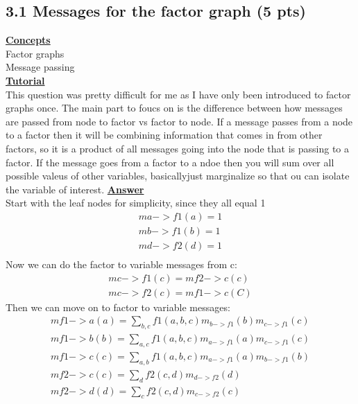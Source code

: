 \documentclass[11pt]{article}
\begin{document}
\subsection{3.1 Messages for the factor graph (5 pts)}
\noindent \textbf{\underline{Concepts}}\\
Factor graphs\\
Message passing\\
\noindent \textbf{\underline{Tutorial}}\\
This question was pretty difficult for me as I have only been introduced to factor graphs once.  The main part to foucs on is the difference
 between how messages are passed from node to factor vs factor to node.  If a message passes from a node to a factor then it will be combining
 information that comes in from other factors, so it is a product of all messages going into the node that is passing to a factor.  If the
 message goes from a factor to a ndoe then you will sum over all possible valeus of other variables, basicallyjust marginalize so that ou can
 isolate the variable of interest.
\noindent \textbf{\underline{Answer}}\\
Start with the leaf nodes for simplicity, since they all equal 1\\
\begin{align*}
    m a -> f1(a) = 1\\
    m b -> f1(b) = 1\\
    m d -> f2(d) = 1\\
\end{align*}
Now we can do the factor to variable messages from c:\\
\begin{align*}
    m c -> f1(c) = m f2 -> c(c)\\
    m c -> f2(c) = m f1 -> c(C)
\end{align*}
Then we can move on to factor to variable messages:\\
\begin{align*}
    m f1 -> a (a) = \sum_{b,c}f1(a,b,c)m_{b->f1}(b)m_{c->f1}(c)\\
    m f1 -> b (b) = \sum_{a,c}f1(a,b,c)m_{a->f1}(a)m_{c->f1}(c)\\
    m f1 -> c (c) = \sum_{a,b}f1(a,b,c)m_{a->f1}(a)m_{b->f1}(b)\\
    m f2 -> c (c) = \sum_{d}f2(c,d)m_{d->f2}(d)\\
    m f2 -> d (d) = \sum_{c}f2(c,d)m_{c->f2}(c)
\end{align*}
\end{document}
